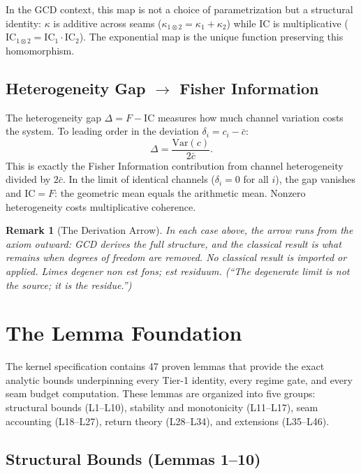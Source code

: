 \documentclass[
  aps,
  prd,
  preprint,
  superscriptaddress,
  nofootinbib,
  floatfix,
  longbibliography
]{revtex4-2}
\newtheorem{remark}{Remark}
\newcommand{\beq}{\begin{equation}}
\newcommand{\eeq}{\end{equation}}
\newcommand{\IC}{\mathrm{IC}}
\newcommand{\Fid}{F}
\newcommand{\Logint}{\kappa}
\newcommand{\hetgap}{\Delta}
\newcommand{\lat}[1]{\textit{#1}}
\begin{document}
In the GCD context, this map is not a choice of
parametrization but a structural identity:
$\Logint$ is additive across seams
($\Logint_{1 \otimes 2} = \Logint_1 + \Logint_2$)
while $\IC$ is multiplicative
($\IC_{1 \otimes 2} = \IC_1 \cdot \IC_2$).
The exponential map is the unique function preserving
this homomorphism.

\subsection{Heterogeneity Gap $\to$ Fisher Information}

The heterogeneity gap $\hetgap = \Fid - \IC$ measures
how much channel variation costs the system.
To leading order in the deviation $\delta_i = c_i - \bar{c}$:
\beq
  \hetgap = \frac{\mathrm{Var}(c)}{2\bar{c}}.
\eeq
This is exactly the Fisher Information contribution
from channel heterogeneity divided by $2\bar{c}$.
In the limit of identical channels ($\delta_i = 0$
for all $i$), the gap vanishes and $\IC = \Fid$:
the geometric mean equals the arithmetic mean.
Nonzero heterogeneity costs multiplicative coherence.

\begin{remark}[The Derivation Arrow]
In each case above, the arrow runs from the axiom
outward: GCD derives the full structure, and the
classical result is what remains when degrees of
freedom are removed.
No classical result is imported or applied.
\lat{Limes degener non est fons; est residuum.}
(``The degenerate limit is not the source; it is
the residue.'')
\end{remark}

\section{The Lemma Foundation}\label{sec:lemmas}

The kernel specification contains 47 proven lemmas that
provide the exact analytic bounds underpinning every
Tier-1 identity, every regime gate, and every seam
budget computation.
These lemmas are organized into five groups:
structural bounds (L1--L10), stability and monotonicity
(L11--L17), seam accounting (L18--L27), return theory
(L28--L34), and extensions (L35--L46).

\subsection{Structural Bounds (Lemmas 1--10)}
\end{document}
